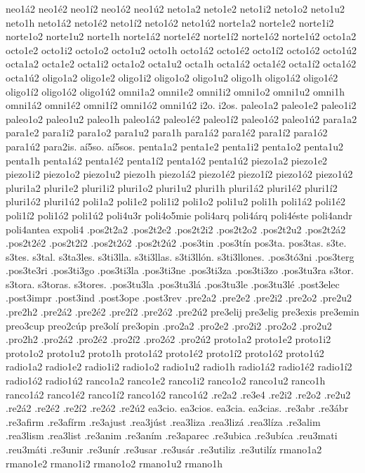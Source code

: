 {neo1á2 neo1é2 neo1í2 neo1ó2 neo1ú2
neto1a2 neto1e2 neto1i2 neto1o2 neto1u2 neto1h
neto1á2 neto1é2 neto1í2 neto1ó2 neto1ú2
norte1a2 norte1e2 norte1i2 norte1o2 norte1u2 norte1h
norte1á2 norte1é2 norte1í2 norte1ó2 norte1ú2
octo1a2 octo1e2 octo1i2 octo1o2 octo1u2 octo1h
octo1á2 octo1é2 octo1í2 octo1ó2 octo1ú2
octa1a2 octa1e2 octa1i2 octa1o2 octa1u2 octa1h
octa1á2 octa1é2 octa1í2 octa1ó2 octa1ú2
oligo1a2 oligo1e2 oligo1i2 oligo1o2 oligo1u2 oligo1h
oligo1á2 oligo1é2 oligo1í2 oligo1ó2 oligo1ú2
omni1a2 omni1e2 omni1i2 omni1o2 omni1u2 omni1h
omni1á2 omni1é2 omni1í2 omni1ó2 omni1ú2
i2o. i2os.
paleo1a2 paleo1e2 paleo1i2 paleo1o2 paleo1u2 paleo1h
paleo1á2 paleo1é2 paleo1í2 paleo1ó2 paleo1ú2
para1a2 para1e2 para1i2 para1o2 para1u2 para1h
para1á2 para1é2 para1í2 para1ó2 para1ú2
para2is. aí5so. aí5sos.
penta1a2 penta1e2 penta1i2 penta1o2 penta1u2 penta1h
penta1á2 penta1é2 penta1í2 penta1ó2 penta1ú2
piezo1a2 piezo1e2 piezo1i2 piezo1o2 piezo1u2 piezo1h
piezo1á2 piezo1é2 piezo1í2 piezo1ó2 piezo1ú2
pluri1a2 pluri1e2 pluri1i2 pluri1o2 pluri1u2 pluri1h
pluri1á2 pluri1é2 pluri1í2 pluri1ó2 pluri1ú2
poli1a2 poli1e2 poli1i2 poli1o2 poli1u2 poli1h
poli1á2 poli1é2 poli1í2 poli1ó2 poli1ú2
poli4u3r
poli4o5mie
poli4arq poli4árq
poli4éste
poli4andr
poli4antea
expoli4
.pos2t2a2 .pos2t2e2 .pos2t2i2 .pos2t2o2 .pos2t2u2
.pos2t2á2 .pos2t2é2 .pos2t2í2 .pos2t2ó2 .pos2t2ú2
.pos3tin .pos3tín
pos3ta. pos3tas.
s3te. s3tes. s3tal. s3ta3les.
s3ti3lla. s3ti3llas. s3ti3llón. s3ti3llones.
.pos3tó3ni
.pos3terg
.pos3te3ri
.pos3ti3go
.pos3ti3la
.pos3ti3ne
.pos3ti3za .pos3ti3zo
.pos3tu3ra
s3tor. s3tora. s3toras. s3tores.
.pos3tu3la .pos3tu3lá .pos3tu3le .pos3tu3lé
.post3elec
.post3impr
.post3ind
.post3ope
.post3rev
.pre2a2 .pre2e2 .pre2i2 .pre2o2 .pre2u2 .pre2h2
.pre2á2 .pre2é2 .pre2í2 .pre2ó2 .pre2ú2
pre3elij pre3elig
pre3exis
pre3emin
preo3cup preo2cúp
pre3olí
pre3opin
.pro2a2 .pro2e2 .pro2i2 .pro2o2 .pro2u2 .pro2h2
.pro2á2 .pro2é2 .pro2í2 .pro2ó2 .pro2ú2
proto1a2 proto1e2 proto1i2 proto1o2 proto1u2 proto1h
proto1á2 proto1é2 proto1í2 proto1ó2 proto1ú2
radio1a2 radio1e2 radio1i2 radio1o2 radio1u2 radio1h
radio1á2 radio1é2 radio1í2 radio1ó2 radio1ú2
ranco1a2 ranco1e2 ranco1i2 ranco1o2 ranco1u2 ranco1h
ranco1á2 ranco1é2 ranco1í2 ranco1ó2 ranco1ú2
.re2a2 .re3e4 .re2i2 .re2o2 .re2u2
.re2á2 .re2é2 .re2í2 .re2ó2 .re2ú2
ea3cio. ea3cios. ea3cia. ea3cias.
.re3abr .re3ábr
.re3afirm .re3afírm
.re3ajust .rea3júst
.rea3liza .rea3lizá .rea3líza
.re3alim
.rea3lism .rea3list
.re3anim .re3aním
.re3aparec
.re3ubica .re3ubíca
.reu3mati .reu3máti
.re3unir .re3unír
.re3usar .re3usár
.re3utiliz .re3utilíz
rmano1a2 rmano1e2 rmano1i2 rmano1o2 rmano1u2 rmano1h
}
